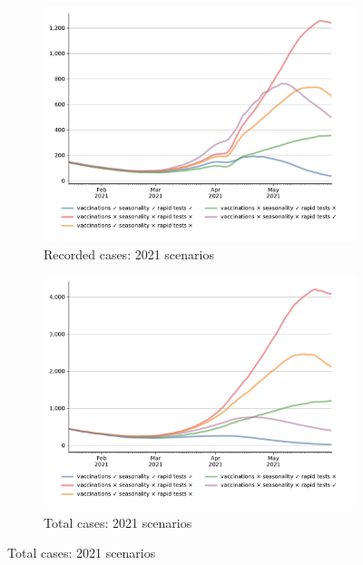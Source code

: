 \begin{figure}[!tp]
    \begin{subfigure}[b]{0.475\textwidth}
        \centering
        \includegraphics[width=\textwidth]{../figures/results/figures/scenario_comparisons/effect_of_channels_on_pessimistic_scenario/full_new_known_case}
        \caption{{Recorded cases: 2021 scenarios}}
        \label{fig:2021_scenarios_recorded}
    \end{subfigure}
    \hfill
    \begin{subfigure}[b]{0.475\textwidth}
        \centering
        \includegraphics[width=\textwidth]{../figures/results/figures/scenario_comparisons/effect_of_channels_on_pessimistic_scenario/full_newly_infected}
        \caption{{Total cases: 2021 scenarios}}
        \label{fig:2021_scenarios_newly_infected}
    \end{subfigure}


\end{figure}
